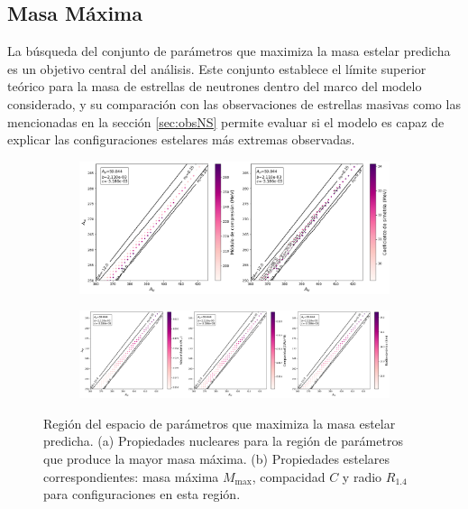 \subsection{Masa Máxima}

La búsqueda del conjunto de parámetros que maximiza la masa estelar predicha es un objetivo central del análisis. Este conjunto establece el límite superior teórico para la masa de estrellas de neutrones dentro del marco del modelo considerado, y su comparación con las observaciones de estrellas masivas como las mencionadas en la sección \ref{sec:obsNS} permite evaluar si el modelo es capaz de explicar las configuraciones estelares más extremas observadas.

\begin{figure}[h]
	\centering
	\begin{subfigure}{\linewidth}
		\centering
		\includegraphics[width=0.85\linewidth]{Figuras/ejemplo_espacio_maxmass}
		\caption{}
		\label{fig:ejemplo_espacio_maxmass}
	\end{subfigure}
	
	\begin{subfigure}{\linewidth}
		\centering
		\includegraphics[width=0.99\linewidth]{Figuras/props_estelar_maxmass}
		\caption{}
		\label{fig:props_estelar_maxmass}
	\end{subfigure}
	\caption[Región de masa máxima en el espacio de parámetros]{Región del espacio de parámetros que maximiza la masa estelar predicha. (a) Propiedades nucleares para la región de parámetros que produce la mayor masa máxima. (b) Propiedades estelares correspondientes: masa máxima $M_\text{max}$, compacidad $C$ y radio $R_{1.4}$ para configuraciones en esta región.}
	\label{fig:max_mass}
\end{figure}

